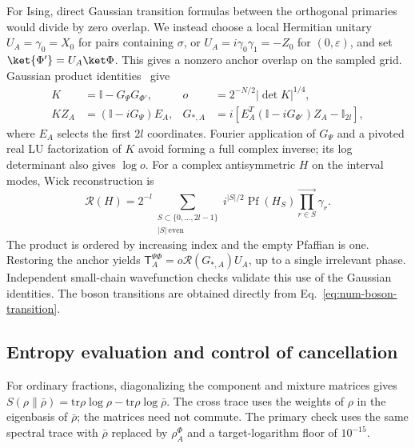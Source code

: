\documentclass[11pt]{article}
\newcommand{\tr}{\mathrm{tr}}
\begin{document}
For Ising, direct Gaussian transition formulas between the
orthogonal primaries would divide by zero overlap. We instead
choose a local Hermitian unitary $U_A=\gamma_0=X_0$ for pairs
containing $\sigma$, or $U_A=i\gamma_0\gamma_1=-Z_0$ for
$(0,\varepsilon)$, and set $\ket{\Phi'}=U_A\ket\Phi$.
This gives a nonzero anchor overlap on the sampled grid.
Gaussian product identities~\cite{numBravyi,numSurace} give
\begin{align}
 K&=\mathbb{I}-G_{\Psi}G_{\Phi'},&
 o&=2^{-N/2}|\det K|^{1/4},\nonumber\\
 KZ_A&=(\mathbb{I}-iG_{\Psi})E_A,&
 G_{*,A}&=i\left[E_A^T(\mathbb{I}-iG_{\Phi'})Z_A-\mathbb{I}_{2l}\right],
 \label{eq:num-anchor-solve}
\end{align}
where $E_A$ selects the first $2l$ coordinates. Fourier
application of $G_{\Psi}$ and a pivoted real LU factorization of
$K$ avoid forming a full complex inverse; its log determinant
also gives $\log o$. For a complex antisymmetric $H$ on the
interval modes, Wick reconstruction is
\begin{equation}
 \mathcal R(H)=2^{-l}
 \sum_{\substack{S\subset\{0,\ldots,2l-1\}\\|S|\ \mathrm{even}}}
 i^{|S|/2}\operatorname{Pf}(H_S)
       \prod_{r\in S}^{\longrightarrow}\gamma_r.
 \label{eq:num-wick}
\end{equation}
The product is ordered by increasing index and the empty
Pfaffian is one. Restoring the anchor yields
$\mathsf T_A^{\Psi\Phi}=o\mathcal R(G_{*,A})U_A$, up to a single irrelevant
phase. Independent small-chain wavefunction checks validate
this use of the Gaussian identities. The boson transitions
are obtained directly from Eq.~\eqref{eq:num-boson-transition}.

\subsection{Entropy evaluation and control of cancellation}
\label{app:num-precision}
For ordinary fractions, diagonalizing the component and mixture
matrices gives $S(\rho\|\bar\rho)=\tr\rho\log\rho-\tr\rho\log\bar\rho$.
The cross trace uses the weights of $\rho$ in the eigenbasis
of $\bar\rho$; the matrices need not commute. The primary check
uses the same spectral trace with $\bar\rho$ replaced by $\rho_A^\Phi$
and a target-logarithm floor of $10^{-15}$.
\end{document}
